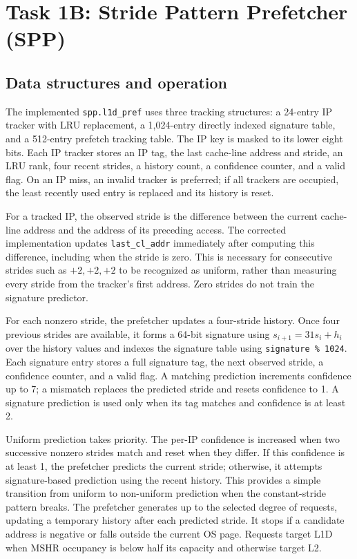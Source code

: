 \section{Task 1B: Stride Pattern Prefetcher (SPP)}
\label{sec:task1b}

\subsection{Data structures and operation}

The implemented \texttt{spp.l1d\_pref} uses three tracking structures: a 24-entry IP tracker with LRU replacement, a 1,024-entry directly indexed signature table, and a 512-entry prefetch tracking table. The IP key is masked to its lower eight bits. Each IP tracker stores an IP tag, the last cache-line address and stride, an LRU rank, four recent strides, a history count, a confidence counter, and a valid flag. On an IP miss, an invalid tracker is preferred; if all trackers are occupied, the least recently used entry is replaced and its history is reset.

For a tracked IP, the observed stride is the difference between the current cache-line address and the address of its preceding access. The corrected implementation updates \texttt{last\_cl\_addr} immediately after computing this difference, including when the stride is zero. This is necessary for consecutive strides such as $+2,+2,+2$ to be recognized as uniform, rather than measuring every stride from the tracker's first address. Zero strides do not train the signature predictor.

For each nonzero stride, the prefetcher updates a four-stride history. Once four previous strides are available, it forms a 64-bit signature using $s_{i+1}=31s_i+h_i$ over the history values and indexes the signature table using \texttt{signature \% 1024}. Each signature entry stores a full signature tag, the next observed stride, a confidence counter, and a valid flag. A matching prediction increments confidence up to 7; a mismatch replaces the predicted stride and resets confidence to 1. A signature prediction is used only when its tag matches and confidence is at least 2.

Uniform prediction takes priority. The per-IP confidence is increased when two successive nonzero strides match and reset when they differ. If this confidence is at least 1, the prefetcher predicts the current stride; otherwise, it attempts signature-based prediction using the recent history. This provides a simple transition from uniform to non-uniform prediction when the constant-stride pattern breaks. The prefetcher generates up to the selected degree of requests, updating a temporary history after each predicted stride. It stops if a candidate address is negative or falls outside the current OS page. Requests target L1D when MSHR occupancy is below half its capacity and otherwise target L2.

